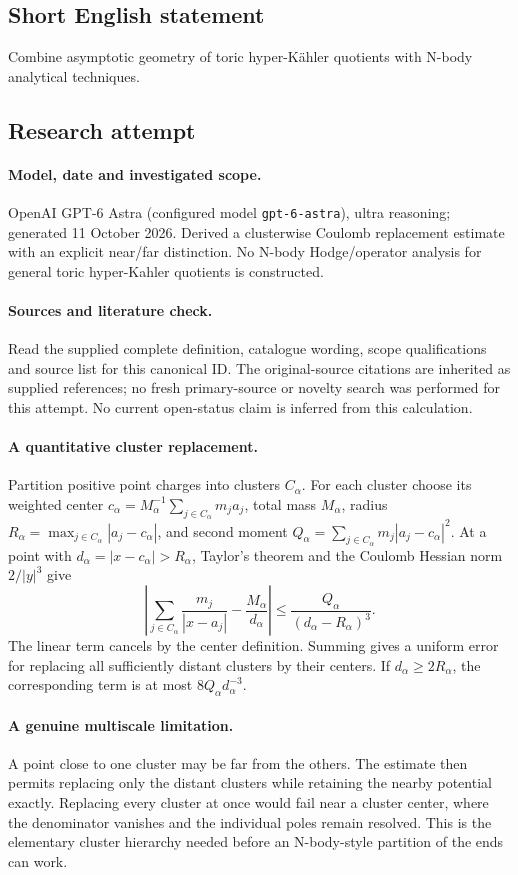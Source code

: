 \documentclass[11pt]{article}
\begin{document}
\subsection{Short English statement}
Combine asymptotic geometry of toric hyper-Kähler quotients with N-body analytical techniques.
\subsection{Research attempt}
\paragraph{Model, date and investigated scope.}
OpenAI GPT-6 Astra (configured model \texttt{gpt-6-astra}), ultra reasoning; generated 11 October 2026. Derived a clusterwise Coulomb replacement estimate with an explicit near/far distinction. No N-body Hodge/operator analysis for general toric hyper-Kahler quotients is constructed.

\paragraph{Sources and literature check.}
Read the supplied complete definition, catalogue wording, scope qualifications and source list for this canonical ID. The original-source citations are inherited as supplied references; no fresh primary-source or novelty search was performed for this attempt. No current open-status claim is inferred from this calculation.

\paragraph{A quantitative cluster replacement.}Partition positive point charges into clusters \(C_\alpha\). For each cluster choose its weighted center \(c_\alpha=M_\alpha^{-1}\sum_{j\in C_\alpha}m_ja_j\), total mass \(M_\alpha\), radius \(R_\alpha=\max_{j\in C_\alpha}|a_j-c_\alpha|\), and second moment \(Q_\alpha=\sum_{j\in C_\alpha}m_j|a_j-c_\alpha|^2\). At a point with \(d_\alpha=|x-c_\alpha|>R_\alpha\), Taylor's theorem and the Coulomb Hessian norm \(2/|y|^3\) give
\[\left|\sum_{j\in C_\alpha}\frac{m_j}{|x-a_j|}-\frac{M_\alpha}{d_\alpha}\right|\le\frac{Q_\alpha}{(d_\alpha-R_\alpha)^3}.
\]
The linear term cancels by the center definition. Summing gives a uniform error for replacing all sufficiently distant clusters by their centers. If \(d_\alpha\ge2R_\alpha\), the corresponding term is at most \(8Q_\alpha d_\alpha^{-3}\).
\paragraph{A genuine multiscale limitation.}A point close to one cluster may be far from the others. The estimate then permits replacing only the distant clusters while retaining the nearby potential exactly. Replacing every cluster at once would fail near a cluster center, where the denominator vanishes and the individual poles remain resolved. This is the elementary cluster hierarchy needed before an N-body-style partition of the ends can work.
\end{document}
